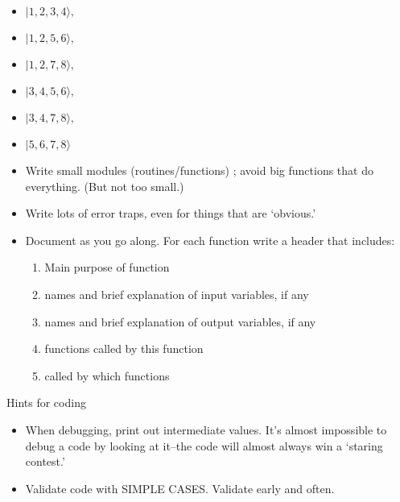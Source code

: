 \documentclass[graybox,sectrefs,envcountresetchap,open=right]{svmonodo}
\begin{document}
\begin{itemize}
\item $|           1,           2 ,          3         ,       4  \rangle , $

\item $|            1      ,     2        ,        5         ,       6 \rangle , $

\item $|            1         ,       2     ,           7         ,       8  \rangle , $

\item $|            3        ,        4      ,          5          ,      6  \rangle , $

\item $|            3        ,        4      ,          7         ,       8  \rangle , $

\item $|            5        ,        6     ,           7     ,           8  \rangle $

\item Write small modules (routines/functions) ; avoid big functions  that do everything. (But not too small.)

\item Write lots of error traps, even for things that are `obvious.'

\item Document as you go along.  For each function write a header that includes: 
\begin{enumerate}

\item Main purpose of function

\item names and  brief explanation of input variables, if any 

\item names and brief explanation of output variables, if any

\item functions called by this function

\item called by which functions
\end{enumerate}

\noindent
\end{itemize}

\noindent
Hints for coding

\begin{itemize}
\item When debugging, print out intermediate values. It's almost impossible to debug a  code by looking at it--the code will almost always win a `staring contest.'

\item Validate code with SIMPLE CASES. Validate early and often.   
\end{itemize}
\end{document}
